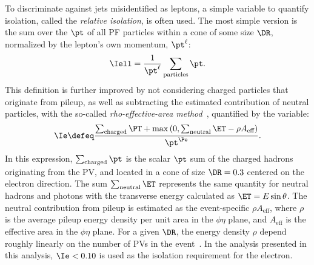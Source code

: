 To discriminate against jets misidentified as leptons, a simple variable to quantify isolation, called the \emph{relative isolation}, is often used.
The most simple version is the sum over the $\pt$ of all PF particles within a cone of some size $\DR$, normalized by the lepton's own momentum, $\pt^\ell$:
\begin{equation} \label{eq:iso_simple}
  \Iell = \frac{1}{\pt^\ell}\sum_\text{particles} \pt.
\end{equation}
This definition is further improved by not considering charged particles that originate from pileup, as well as subtracting the estimated contribution of neutral particles, with the so-called \emph{rho-effective-area method}~\cite{PU_substraction}, quantified by the variable:
\begin{equation} \label{eq:iso_ele}
  \Ie \defeq
    \frac{\sum_\text{charged} \PT + \max\left( 0, \sum_\text{neutral} \ET
                                  - \rho A_\text{eff} \right )}{\pt^{\Pe}}. 
\end{equation}
In this expression, $\sum_\text{charged} \pt$ is the scalar $\pt$ sum of the charged hadrons originating from the PV, and located in a cone of size $\DR = 0.3$ centered on the electron direction.
The sum $\sum_\text{neutral} \ET$ represents the same quantity for neutral hadrons and photons with the transverse energy calculated as $\ET=E\sin\theta$.
The neutral contribution from pileup %
is estimated as the event-specific $\rho A_\text{eff}$, where $\rho$ is the average pileup energy density per unit area in the $\phi\eta$ plane, and $A_\text{eff}$ is the effective area in the $\phi\eta$ plane.
For a given $\DR$, the energy density $\rho$ depend roughly linearly on the number of PVs in the event~\cite{CMS_electron}.
In the analysis presented in this analysis, $\Ie < 0.10$ is used as the isolation requirement for the electron.



